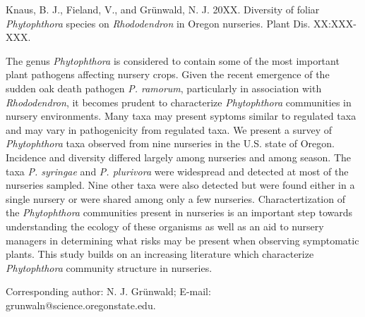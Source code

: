 \documentclass[12pt]{article}
\begin{document}
\begin{flushleft}
Knaus, B. J., Fieland, V., and Gr\"{u}nwald, N. J. 20XX. Diversity of foliar \textit{Phytophthora} species on \textit{Rhododendron} in Oregon nurseries. Plant Dis. XX:XXX-XXX.
\\

\hspace{12pt}


\linenumbers


The genus \emph{Phytophthora} is considered to contain some of the most important plant pathogens affecting nursery crops. Given the recent emergence of the sudden oak death pathogen \emph{P. ramorum}, particularly in association with \emph{Rhododendron}, it becomes prudent to characterize \emph{Phytophthora} communities in nursery environments.  Many taxa may present syptoms similar to regulated taxa and may vary in pathogenicity from regulated taxa.  We present a survey of \emph{Phytophthora} taxa observed from nine nurseries in the U.S. state of Oregon.  Incidence and diversity differed largely among nurseries and among season.  The taxa \emph{P. syringae} and \emph{P. plurivora} were widespread and detected at most of the nurseries sampled.  Nine other taxa were also detected but were found either in a single nursery or were shared among only a few nurseries.  Charactertization of the \emph{Phytophthora} communities present in nurseries is an important step towards understanding the ecology of these organisms as well as an aid to nursery managers in determining what risks may be present when observing symptomatic plants.  This study builds on an increasing literature which characterize \emph{Phytophthora} community structure in nurseries.


\hspace{12pt}

Corresponding author: N. J. Gr\"{u}nwald; E-mail: grunwaln@science.oregonstate.edu.

\end{flushleft}


\noindent\makebox[\linewidth]{\rule{\textwidth}{1pt}} 
\end{document}
